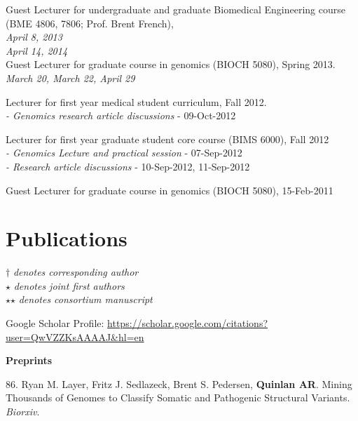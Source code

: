 \documentclass[margin,line]{cv}
\begin{document}
\begin{resume}
    \vspace{-2mm}
    Guest Lecturer for undergraduate and graduate Biomedical Engineering course (BME 4806, 7806; Prof. Brent French), \\
    \emph{April 8, 2013} \\
    \emph{April 14, 2014} \\

    Guest Lecturer for graduate course in genomics (BIOCH 5080), Spring 2013. \\
	\emph{March 20, March 22, April 29}

    Lecturer for first year medical student curriculum, Fall 2012. \\
	\emph{- Genomics research article discussions} - 09-Oct-2012

    \vspace{-2mm}
    Lecturer for first year graduate student core course (BIMS 6000), Fall 2012 \\
	\emph{- Genomics Lecture and practical session} - 07-Sep-2012 \\
	\emph{- Research article discussions} - 10-Sep-2012, 11-Sep-2012

    \vspace{-2mm}
    Guest Lecturer for graduate course in genomics (BIOCH 5080), 15-Feb-2011


    \section{\mysidestyle Publications}
    $\dagger$\textit{ denotes corresponding author }\\
    $\star$\textit{ denotes joint first authors }\\
    $\star$$\star$\textit{ denotes consortium manuscript }

    Google Scholar Profile: \url{https://scholar.google.com/citations?user=QwVZZKsAAAAJ&hl=en}

    \textbf{Preprints} \\

    \begin{list}{*}{}


    \item[86.] Ryan M. Layer, Fritz J. Sedlazeck, Brent S. Pedersen, \textbf{Quinlan AR}. Mining Thousands of Genomes to Classify Somatic and Pathogenic Structural Variants. \emph{Biorxiv}. 


\end{list}
\end{resume}
\end{document}
